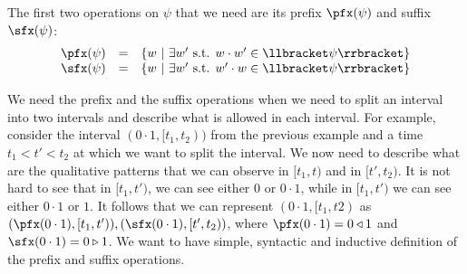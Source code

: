 The first two operations on $\psi$ that we need are its prefix $\pfx(\psi)$ and suffix $\sfx(\psi)$:
\begin{equation}
\begin{array}{lcl}
\pfx(\psi) & = & \{ w~|~ \exists w' \text{ s.t. } w\cdot w' \in \llbracket \psi \rrbracket \} \\
\sfx(\psi) & = & \{ w~|~ \exists w' \text{ s.t. } w'\cdot w \in \llbracket \psi \rrbracket \} \\
\end{array}
\end{equation}

\begin{example}
 We need the prefix and the suffix operations when we need to split an interval into two intervals and describe what is allowed in each interval. For example, consider the interval $(0\cdot 1, [t_1, t_2))$ from the previous example and a time $t_1 < t' < t_2$ at which we want to split the interval. We now need to describe what are the qualitative patterns that we can observe in $[t_1, t)$ and in $[t', t_2)$. It is not hard to see that in $[t_1, t')$, we can see either $0$ or $0 \cdot 1$, while in $[t_1, t')$ we can see either $0 \cdot 1$ or $1$. It follows that we can represent $(0 \cdot 1, [t_1, t2)$ as $(\pfx(0\cdot 1), [t_1, t')), (\sfx(0 \cdot 1), [t', t_2))$, where $\pfx(0 \cdot 1) = 0 \triangleleft 1$ and $\sfx(0 \cdot 1) = 0 \triangleright 1$. We want to have simple, syntactic and inductive definition of the prefix and suffix operations.
\end{example}